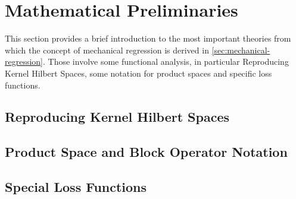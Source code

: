 \section{Mathematical Preliminaries}
\label{sec:preliminaries}

This section provides a brief introduction to the most important theories from which the concept of mechanical regression is derived in \cref{sec:mechanical-regression}.
Those involve some functional analysis, in particular Reproducing Kernel Hilbert Spaces, some notation for product spaces and specific loss functions.

\subsection{Reproducing Kernel Hilbert Spaces}



%
%

\subsection{Product Space and Block Operator Notation}
\label{sec:block-operator-notation}



\subsection{Special Loss Functions}


%
